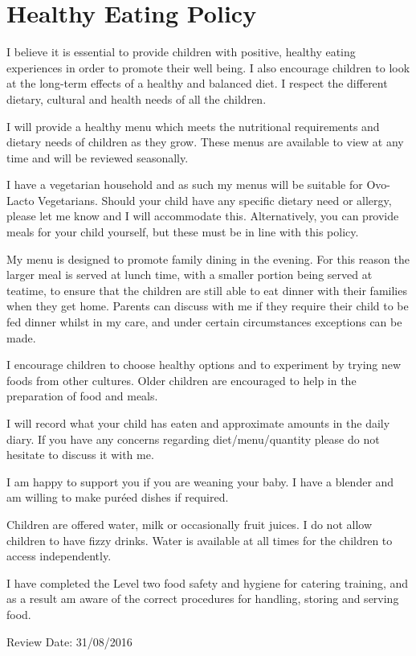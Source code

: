 

\section{Healthy Eating Policy}

I believe it is essential to provide children with positive, healthy
eating experiences in order to promote their well being. I also
encourage children to look at the long-term effects of a healthy and
balanced diet. I respect the different dietary, cultural and health
needs of all the children.

I will provide a healthy menu which meets the nutritional requirements
and dietary needs of children as they grow. These menus are available to
view at any time and will be reviewed seasonally.

I have a vegetarian household and as such my menus will be suitable for
Ovo-Lacto Vegetarians. Should your child have any specific dietary need
or allergy, please let me know and I will accommodate this.
Alternatively, you can provide meals for your child yourself, but these
must be in line with this policy.

My menu is designed to promote family dining in the evening. For this
reason the larger meal is served at lunch time, with a smaller portion
being served at teatime, to ensure that the children are still able to
eat dinner with their families when they get home. Parents can discuss
with me if they require their child to be fed dinner whilst in my care,
and under certain circumstances exceptions can be made.

I encourage children to choose healthy options and to experiment by
trying new foods from other cultures. Older children are encouraged to
help in the preparation of food and meals.

I will record what your child has eaten and approximate amounts in the
daily diary. If you have any concerns regarding diet/menu/quantity
please do not hesitate to discuss it with me.

I am happy to support you if you are weaning your baby. I have a blender
and am willing to make puréed dishes if required.

Children are offered water, milk or occasionally fruit juices. I do not
allow children to have fizzy drinks. Water is available at all times for
the children to access independently.

I have completed the Level two food safety and hygiene for catering
training, and as a result am aware of the correct procedures for
handling, storing and serving food.

Review Date: 31/08/2016


